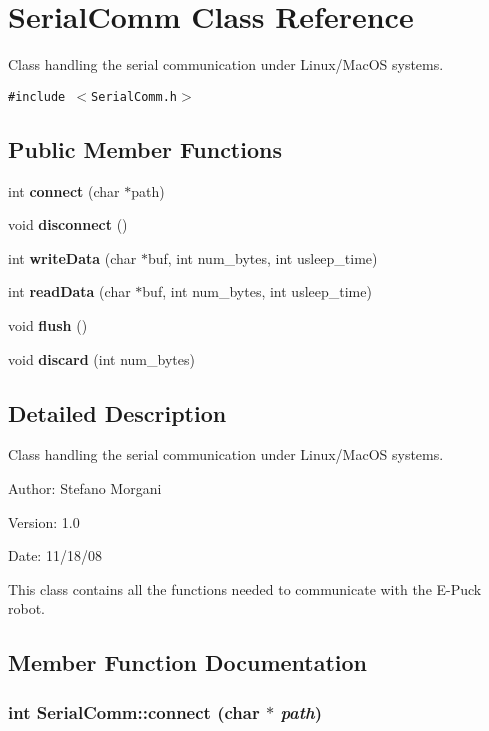 \section{SerialComm Class Reference}
\label{class_serial_comm}
Class handling the serial communication under Linux/MacOS systems.  


{\tt \#include $<$SerialComm.h$>$}

\subsection*{Public Member Functions}
\begin{CompactItemize}
\item 
int {\bf connect} (char $\ast$path)
\item 
void {\bf disconnect} ()
\item 
int {\bf writeData} (char $\ast$buf, int num\_\-bytes, int usleep\_\-time)
\item 
int {\bf readData} (char $\ast$buf, int num\_\-bytes, int usleep\_\-time)
\item 
void {\bf flush} ()
\item 
void {\bf discard} (int num\_\-bytes)
\end{CompactItemize}


\subsection{Detailed Description}
Class handling the serial communication under Linux/MacOS systems. 

\begin{Desc}
\item[Author:]Stefano Morgani \end{Desc}
\begin{Desc}
\item[Version:]1.0 \end{Desc}
\begin{Desc}
\item[Date:]11/18/08\end{Desc}
This class contains all the functions needed to communicate with the E-Puck robot. 

\subsection{Member Function Documentation}
\subsubsection[connect]{\setlength{\rightskip}{0pt plus 5cm}int SerialComm::connect (char $\ast$ {\em path})}\label{class_serial_comm_09d47dff989d5263a903efef942df65e}


